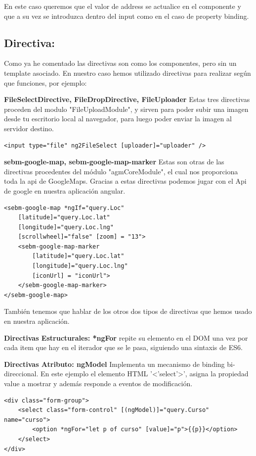 En este caso queremos que el valor de address se actualice en el componente y que a su vez se introduzca dentro del input como en el caso de property binding.

\subsection{Directiva: }Como ya he comentado las directivas son como los componentes, pero sin un template asociado. En nuestro caso hemos utilizado directivas para realizar según que funciones, por ejemplo:

\item \textbf{FileSelectDirective, FileDropDirective, FileUploader} Estas tres directivas proceden del modulo "FileUploadModule", y sirven para poder subir una imagen desde tu escritorio local al navegador, para luego poder enviar la imagen al servidor destino.

\begin{lstlisting}
<input type="file" ng2FileSelect [uploader]="uploader" />
\end{lstlisting}
\item \textbf{sebm-google-map, sebm-google-map-marker} Estas son otras de las directivas procedentes del módulo "agmCoreModule", el cual nos proporciona toda la api de GoogleMaps. Gracias a estas directivas podemos jugar con el Api de google en nuestra aplicación angular.

\begin{lstlisting}
<sebm-google-map *ngIf="query.Loc"
    [latitude]="query.Loc.lat" 
    [longitude]="query.Loc.lng"
    [scrollwheel]="false" [zoom] = "13">
    <sebm-google-map-marker
        [latitude]="query.Loc.lat"
        [longitude]="query.Loc.lng"
        [iconUrl] = "iconUrl">
    </sebm-google-map-marker>
</sebm-google-map>
\end{lstlisting}

También tenemos que hablar de los otros dos tipos de directivas que hemos usado en nuestra aplicación.

\item \textbf{Directivas Estructurales: *ngFor} repite su elemento en el DOM una vez por cada item que hay en el iterador que se le pasa, siguiendo una sintaxis de ES6. 

\item \textbf{Directivas Atributo: ngModel} Implementa un mecanismo de binding bi-direccional. En este ejemplo el elemento HTML '<'select'>', asigna la propiedad value a mostrar y además responde a eventos de modificación.
\begin{lstlisting}
<div class="form-group">
    <select class="form-control" [(ngModel)]="query.Curso" name="curso">
        <option *ngFor="let p of curso" [value]="p">{{p}}</option>
    </select>
</div>
\end{lstlisting}

